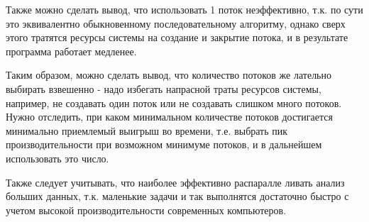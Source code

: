 Также можно сделать вывод, что использовать 1 поток неэффек­тивно, 
т.к. по сути это эквивалентно обыкновенному последовательному
алгоритму, однако сверх этого тратятся ресурсы системы на создание и
закрытие потока, и в результате программа работает медленее.

Таким образом, можно сделать вывод, что количество потоков же­
лательно выбирать взвешенно - надо избегать напрасной траты ресурсов
системы, например, не создавать один поток или не создавать слишком
много потоков. Нужно отследить, при каком минимальном количестве
потоков достигается минимально приемлемый выигрыш во времени, т.е.
выбрать пик производительности при возможном минимуме потоков, и
в дальнейшем использовать это число.

Также следует учитывать, что наиболее эффективно распаралле­
ливать анализ больших данных, т.к. маленькие задачи и так выполнятся
достаточно быстро с учетом высокой производительности современных
компьютеров.
